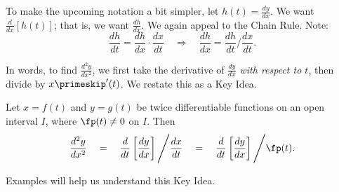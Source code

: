 To make the upcoming notation a bit simpler, let $h(t) = \frac{dy}{dx}$. We want $\frac{d}{dx}[h(t)]$; that is, we want $\frac{dh}{dx}$. We again appeal to the Chain Rule. Note:
$$\frac{dh}{dt} = \frac{dh}{dx}\cdot\frac{dx}{dt} \quad \Rightarrow \quad \frac{dh}{dx} = \frac{dh}{dt}\Bigg/\frac{dx}{dt}.$$

In words, to find $\frac{d^2y}{dx^2}$, we first take the derivative of $\frac{dy}{dx}$ \textit{with respect to $t$}, then divide by $x\primeskip'(t)$. We restate this as a Key Idea.

{Let $x=f(t)$ and $y=g(t)$ be twice differentiable functions on an open interval $I$, where $\fp(t)\neq 0$ on $I$. Then 
$$\frac{d^2y}{dx^2}\quad = \quad\frac{d}{dt}\left[\frac{dy}{dx}\right]\Bigg/\frac{dx}{dt} \quad=\quad \frac{d}{dt}\left[\frac{dy}{dx}\right]\Bigg/\fp(t).$$ 
}

Examples will help us understand this Key Idea.

